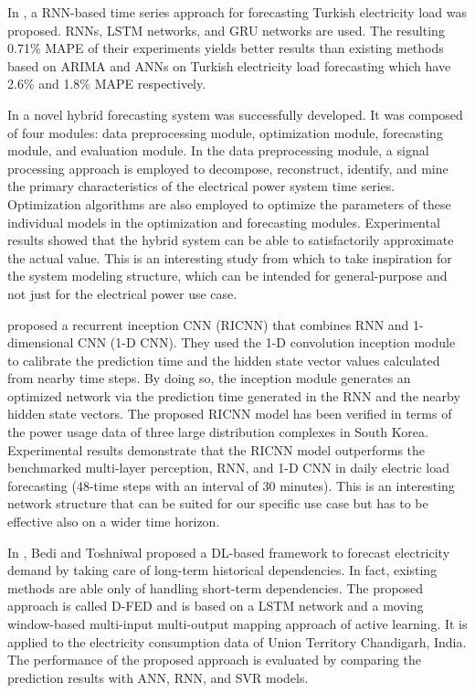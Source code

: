 In \cite{8404313}, a RNN-based time series approach for forecasting Turkish electricity load was proposed.
RNNs, LSTM networks, and GRU networks are used.
The resulting 0.71\% MAPE of their experiments yields better results than existing methods based on ARIMA and ANNs on Turkish electricity load forecasting which have 2.6\% and 1.8\% MAPE respectively.

In \cite{DU2018533} a novel hybrid forecasting system was successfully developed.
It was composed of four modules: data preprocessing module, optimization module, forecasting module, and evaluation module.
In the data preprocessing module, a signal processing approach is employed to decompose, reconstruct, identify, and mine the primary characteristics of the electrical power system time series.
Optimization algorithms are also employed to optimize the parameters of these individual models in the optimization and forecasting modules.
Experimental results showed that the hybrid system can be able to satisfactorily approximate the actual value.
This is an interesting study from which to take inspiration for the system modeling structure, which can be intended for general-purpose and not just for the electrical power use case.

\cite{KIM2019328} proposed a recurrent inception CNN (RICNN) that combines RNN and 1-dimensional CNN (1-D CNN).
They used the 1-D convolution inception module to calibrate the prediction time and the hidden state vector values calculated from nearby time steps.
By doing so, the inception module generates an optimized network via the prediction time generated in the RNN and the nearby hidden state vectors.
The proposed RICNN model has been verified in terms of the power usage data of three large distribution complexes in South Korea.
Experimental results demonstrate that the RICNN model outperforms the benchmarked multi-layer perception, RNN, and 1-D CNN in daily electric load forecasting (48-time steps with an interval of 30 minutes).
This is an interesting network structure that can be suited for our specific use case but has to be effective also on a wider time horizon.

In \cite{BEDI20191312}, Bedi and Toshniwal proposed a DL-based framework to forecast electricity demand by taking care of long-term historical dependencies.
In fact, existing methods are able only of handling short-term dependencies.
The proposed approach is called D-FED and is based on a LSTM network and a moving window-based multi-input multi-output mapping approach of active learning.
It is applied to the electricity consumption data of Union Territory Chandigarh, India.
The performance of the proposed approach is evaluated by comparing the prediction results with ANN, RNN, and SVR models.

